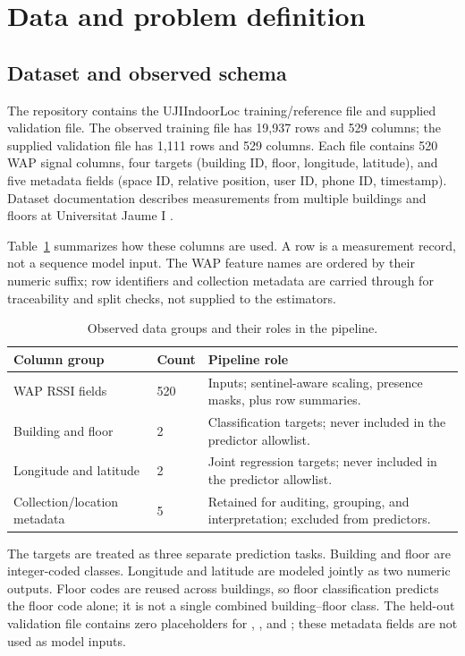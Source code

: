 \documentclass[conference]{IEEEtran}
\begin{document}
\section{Data and problem definition}
\subsection{Dataset and observed schema}
The repository contains the UJIIndoorLoc training/reference file and supplied validation file. The observed training file has 19,937 rows and 529 columns; the supplied validation file has 1,111 rows and 529 columns. Each file contains 520 WAP signal columns, four targets (building ID, floor, longitude, latitude), and five metadata fields (space ID, relative position, user ID, phone ID, timestamp). Dataset documentation describes measurements from multiple buildings and floors at Universitat Jaume I \cite{uci,torres2014}.

Table~\ref{tab:schema} summarizes how these columns are used. A row is a measurement record, not a sequence model input. The WAP feature names are ordered by their numeric suffix; row identifiers and collection metadata are carried through for traceability and split checks, not supplied to the estimators.

\begin{table}[!t]
\centering
\caption{Observed data groups and their roles in the pipeline.}
\label{tab:schema}
\begin{tabularx}{\columnwidth}{p{} p{} X}
\toprule
Column group & Count & Pipeline role \\
\midrule
WAP RSSI fields & 520 & Inputs; sentinel-aware scaling, presence masks, plus row summaries. \\
Building and floor & 2 & Classification targets; never included in the predictor allowlist. \\
Longitude and latitude & 2 & Joint regression targets; never included in the predictor allowlist. \\
Collection/location metadata & 5 & Retained for auditing, grouping, and interpretation; excluded from predictors. \\
\bottomrule
\end{tabularx}
\end{table}

The targets are treated as three separate prediction tasks. Building and floor are integer-coded classes. Longitude and latitude are modeled jointly as two numeric outputs. Floor codes are reused across buildings, so floor classification predicts the floor code alone; it is not a single combined building--floor class. The held-out validation file contains zero placeholders for , , and ; these metadata fields are not used as model inputs.
\end{document}
